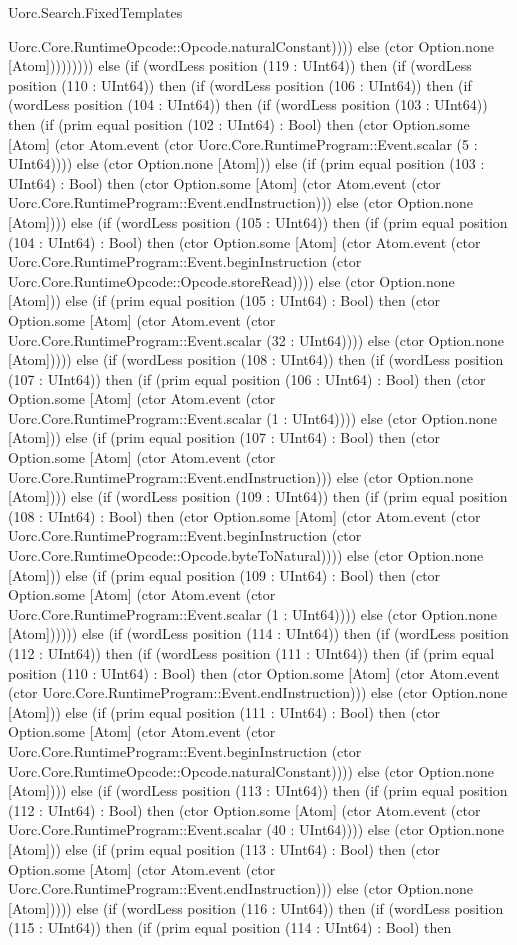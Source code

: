 \begin{lexlean}{Uorc.Search.FixedTemplates}
\begin{semanticmodule}
{Uorc.Core.RuntimeOpcode::Opcode.naturalConstant)))) else (ctor Option.none [Atom])))))))) else (if (wordLess position (119 : UInt64)) then (if (wordLess position (110 : UInt64)) then (if (wordLess position (106 : UInt64)) then (if (wordLess position (104 : UInt64)) then (if (wordLess position (103 : UInt64)) then (if (prim equal position (102 : UInt64) : Bool) then (ctor Option.some [Atom] (ctor Atom.event (ctor Uorc.Core.RuntimeProgram::Event.scalar (5 : UInt64)))) else (ctor Option.none [Atom])) else (if (prim equal position (103 : UInt64) : Bool) then (ctor Option.some [Atom] (ctor Atom.event (ctor Uorc.Core.RuntimeProgram::Event.endInstruction))) else (ctor Option.none [Atom]))) else (if (wordLess position (105 : UInt64)) then (if (prim equal position (104 : UInt64) : Bool) then (ctor Option.some [Atom] (ctor Atom.event (ctor Uorc.Core.RuntimeProgram::Event.beginInstruction (ctor Uorc.Core.RuntimeOpcode::Opcode.storeRead)))) else (ctor Option.none [Atom])) else (if (prim equal position (105 : UInt64) : Bool) then (ctor Option.some [Atom] (ctor Atom.event (ctor Uorc.Core.RuntimeProgram::Event.scalar (32 : UInt64)))) else (ctor Option.none [Atom])))) else (if (wordLess position (108 : UInt64)) then (if (wordLess position (107 : UInt64)) then (if (prim equal position (106 : UInt64) : Bool) then (ctor Option.some [Atom] (ctor Atom.event (ctor Uorc.Core.RuntimeProgram::Event.scalar (1 : UInt64)))) else (ctor Option.none [Atom])) else (if (prim equal position (107 : UInt64) : Bool) then (ctor Option.some [Atom] (ctor Atom.event (ctor Uorc.Core.RuntimeProgram::Event.endInstruction))) else (ctor Option.none [Atom]))) else (if (wordLess position (109 : UInt64)) then (if (prim equal position (108 : UInt64) : Bool) then (ctor Option.some [Atom] (ctor Atom.event (ctor Uorc.Core.RuntimeProgram::Event.beginInstruction (ctor Uorc.Core.RuntimeOpcode::Opcode.byteToNatural)))) else (ctor Option.none [Atom])) else (if (prim equal position (109 : UInt64) : Bool) then (ctor Option.some [Atom] (ctor Atom.event (ctor Uorc.Core.RuntimeProgram::Event.scalar (1 : UInt64)))) else (ctor Option.none [Atom]))))) else (if (wordLess position (114 : UInt64)) then (if (wordLess position (112 : UInt64)) then (if (wordLess position (111 : UInt64)) then (if (prim equal position (110 : UInt64) : Bool) then (ctor Option.some [Atom] (ctor Atom.event (ctor Uorc.Core.RuntimeProgram::Event.endInstruction))) else (ctor Option.none [Atom])) else (if (prim equal position (111 : UInt64) : Bool) then (ctor Option.some [Atom] (ctor Atom.event (ctor Uorc.Core.RuntimeProgram::Event.beginInstruction (ctor Uorc.Core.RuntimeOpcode::Opcode.naturalConstant)))) else (ctor Option.none [Atom]))) else (if (wordLess position (113 : UInt64)) then (if (prim equal position (112 : UInt64) : Bool) then (ctor Option.some [Atom] (ctor Atom.event (ctor Uorc.Core.RuntimeProgram::Event.scalar (40 : UInt64)))) else (ctor Option.none [Atom])) else (if (prim equal position (113 : UInt64) : Bool) then (ctor Option.some [Atom] (ctor Atom.event (ctor Uorc.Core.RuntimeProgram::Event.endInstruction))) else (ctor Option.none [Atom])))) else (if (wordLess position (116 : UInt64)) then (if (wordLess position (115 : UInt64)) then (if (prim equal position (114 : UInt64) : Bool) then }
\end{semanticmodule}
\end{lexlean}
